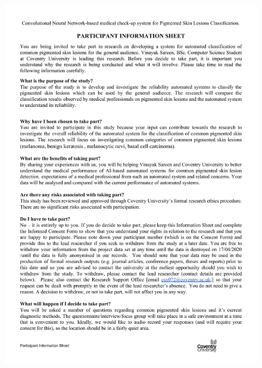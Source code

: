 \begin{figure}[!htp]
    \centering
    \includegraphics[width=15cm]{Documents/participation.pdf}
\end{figure}

